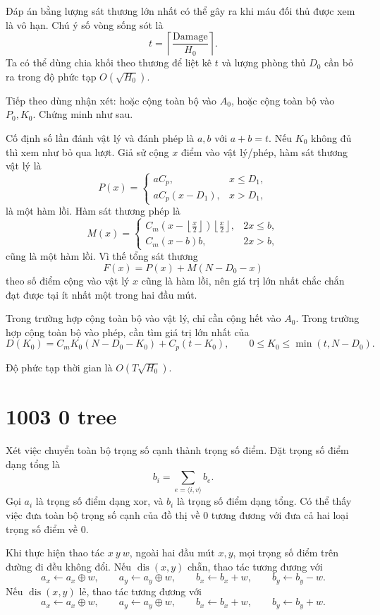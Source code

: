 \documentclass[11pt]{article}
\begin{document}
Đáp án bằng lượng sát thương lớn nhất có thể gây ra khi máu đối thủ được xem
là vô hạn. Chú ý số vòng sống sót là
\[
  t=\left\lceil \frac{\mathrm{Damage}}{H_0}\right\rceil .
\]
Ta có thể dùng chia khối theo thương để liệt kê $t$ và lượng phòng thủ $D_0$
cần bỏ ra trong độ phức tạp $O(\sqrt{H_0})$.

Tiếp theo dùng nhận xét: hoặc cộng toàn bộ vào $A_0$, hoặc cộng toàn bộ vào
$P_0,K_0$. Chứng minh như sau.

Cố định số lần đánh vật lý và đánh phép là $a,b$ với $a+b=t$. Nếu $K_0$
không đủ thì xem như bỏ qua lượt. Giả sử cộng $x$ điểm vào vật lý/phép, hàm
sát thương vật lý là
\[
  P(x)=
  \begin{cases}
    aC_p, & x\le D_1,\\
    aC_p(x-D_1), & x>D_1,
  \end{cases}
\]
là một hàm lồi. Hàm sát thương phép là
\[
  M(x)=
  \begin{cases}
    C_m\left(x-\left\lfloor\frac{x}{2}\right\rfloor\right)
       \left\lfloor\frac{x}{2}\right\rfloor, & 2x\le b,\\
    C_m(x-b)b, & 2x>b,
  \end{cases}
\]
cũng là một hàm lồi. Vì thế tổng sát thương
\[
  F(x)=P(x)+M(N-D_0-x)
\]
theo số điểm cộng vào vật lý $x$ cũng là hàm lồi, nên giá trị lớn nhất
chắc chắn đạt được tại ít nhất một trong hai đầu mút.

Trong trường hợp cộng toàn bộ vào vật lý, chỉ cần cộng hết vào $A_0$.
Trong trường hợp cộng toàn bộ vào phép, cần tìm giá trị lớn nhất của
\[
  D(K_0)=C_mK_0(N-D_0-K_0)+C_p(t-K_0),
  \qquad 0\le K_0\le \min(t,N-D_0).
\]

Độ phức tạp thời gian là $O(T\sqrt{H_0})$.

\section{1003 0 tree}

Xét việc chuyển toàn bộ trọng số cạnh thành trọng số điểm. Đặt trọng số điểm
dạng tổng là
\[
  b_i=\sum_{e=\langle i,v\rangle} b_e.
\]
Gọi $a_i$ là trọng số điểm dạng xor, và $b_i$ là trọng số điểm dạng tổng. Có
thể thấy việc đưa toàn bộ trọng số cạnh của đồ thị về $0$ tương đương với
đưa cả hai loại trọng số điểm về $0$.

Khi thực hiện thao tác $x\ y\ w$, ngoài hai đầu mút $x,y$, mọi trọng số điểm
trên đường đi đều không đổi. Nếu $\operatorname{dis}(x,y)$ chẵn, thao tác
tương đương với
\[
  a_x\gets a_x\oplus w,\qquad
  a_y\gets a_y\oplus w,\qquad
  b_x\gets b_x+w,\qquad
  b_y\gets b_y-w.
\]
Nếu $\operatorname{dis}(x,y)$ lẻ, thao tác tương đương với
\[
  a_x\gets a_x\oplus w,\qquad
  a_y\gets a_y\oplus w,\qquad
  b_x\gets b_x+w,\qquad
  b_y\gets b_y+w.
\]
\end{document}
